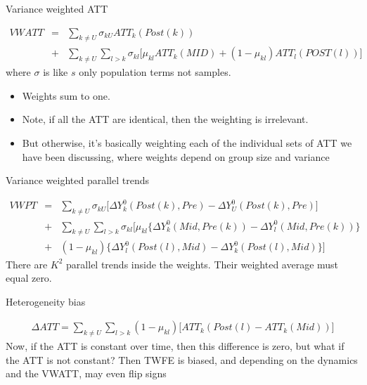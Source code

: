 \documentclass{beamer}
\begin{document}
\begin{frame}{Variance weighted ATT}

\begin{eqnarray*}
VWATT &=& \sum_{k \neq U} \sigma_{kU} ATT_k(Post(k))\\
&+& \sum_{k \neq U} \sum_{l>k} \sigma_{kl} \bigg [ \mu_{kl} ATT_k (MID)+ (1-\mu_{kl}) ATT_{l} (POST(l)) \bigg ]
\end{eqnarray*}where $\sigma$ is like $s$ only population terms not samples.  
\begin{itemize}
\item Weights sum to one. 
\item Note, if all the ATT are identical, then the weighting is irrelevant. 
\item But otherwise, it's basically weighting each of the individual sets of ATT we have been discussing, where weights depend on group size and variance
\end{itemize}

\end{frame}

\begin{frame}{Variance weighted parallel trends}

\begin{eqnarray*}
VWPT &=& \sum_{k \neq U} \sigma_{kU} \bigg [ \Delta Y_k^0(Post(k),Pre) - \Delta Y_U^0(Post(k),Pre) \bigg ] \\
&+& \sum_{k \neq U} \sum_{l>k} \sigma_{kl} \bigg [ \mu_{kl} \{ \Delta Y^0_k(Mid,Pre(k)) - \Delta Y_l^0(Mid,Pre(k))\} \\
&+&(1-\mu_{kl}) \{ \Delta Y^0_l(Post(l), Mid) - \Delta Y^0_k(Post(l), Mid) \} \bigg ]
\end{eqnarray*}There are $K^2$ parallel trends inside the weights. Their weighted average must equal zero.

\end{frame}

\begin{frame}{Heterogeneity bias}

\begin{eqnarray*}
\Delta ATT = \sum_{k \neq U} \sum_{l>k} (1 - \mu_{kl}) \bigg [ ATT_k(Post(l) - ATT_k(Mid)) \bigg ]
\end{eqnarray*}Now, if the ATT is constant over time, then this difference is zero, but what if the ATT is not constant? Then TWFE is biased, and depending on the dynamics and the VWATT, may even flip signs
\end{frame}
\end{document}
